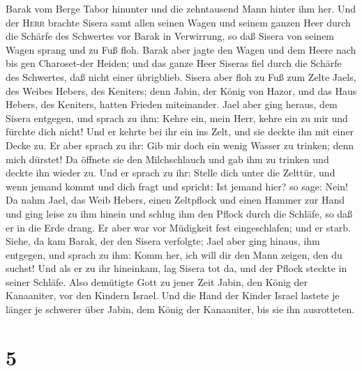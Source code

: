 Barak vom Berge Tabor hinunter und die zehntausend Mann hinter ihm her.
 Und der \textsc{Herr} brachte Sisera samt allen seinen
Wagen und seinem ganzen Heer durch die Schärfe des Schwertes vor Barak
in Verwirrung, so daß Sisera von seinem Wagen sprang und zu Fuß floh.
 Barak aber jagte den Wagen und dem Heere nach bis gen
Charoset-der Heiden; und das ganze Heer Siseras fiel durch die Schärfe
des Schwertes, daß nicht einer übrigblieb.  Sisera aber
floh zu Fuß zum Zelte Jaels, des Weibes Hebers, des Keniters; denn
Jabin, der König von Hazor, und das Haus Hebers, des Keniters, hatten
Frieden miteinander.  Jael aber ging heraus, dem Sisera
entgegen, und sprach zu ihm: Kehre ein, mein Herr, kehre ein zu mir und
fürchte dich nicht! Und er kehrte bei ihr ein ins Zelt, und sie deckte
ihn mit einer Decke zu.  Er aber sprach zu ihr: Gib mir
doch ein wenig Wasser zu trinken; denn mich dürstet! Da öffnete sie den
Milchschlauch und gab ihm zu trinken und deckte ihn wieder zu.
 Und er sprach zu ihr: Stelle dich unter die Zelttür, und
wenn jemand kommt und dich fragt und spricht: Ist jemand hier? so sage:
Nein!  Da nahm Jael, das Weib Hebers, einen Zeltpflock
und einen Hammer zur Hand und ging leise zu ihm hinein und schlug ihm
den Pflock durch die Schläfe, so daß er in die Erde drang. Er aber war
vor Müdigkeit fest eingeschlafen; und er starb.  Siehe,
da kam Barak, der den Sisera verfolgte; Jael aber ging hinaus, ihm
entgegen, und sprach zu ihm: Komm her, ich will dir den Mann zeigen, den
du suchst! Und als er zu ihr hineinkam, lag Sisera tot da, und der
Pflock steckte in seiner Schläfe.  Also demütigte Gott zu
jener Zeit Jabin, den König der Kanaaniter, vor den Kindern Israel.
 Und die Hand der Kinder Israel lastete je länger je
schwerer über Jabin, dem König der Kanaaniter, bis sie ihn ausrotteten.

\hypertarget{section-4}{%
\section{5}\label{section-4}}

